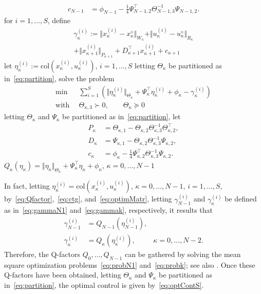 \documentclass[10pt]{IEEEtran}      %
\newcommand{\col}{\mathrm{col}}
\theoremstyle{theorem}
\theoremstyle{remark}
\begin{document}
\begin{algorithm}[H]
\begin{algorithmic}[1]
\begin{align*}
	 c_{N-1} & = \phi_{N-1} - \tfrac{1}{4}\Psi_{N-1,2}^\top\Theta_{N-1,3}^{-1}\Psi_{N-1,2}.
	 \end{align*}
	\STATE for $i=1,\dots,S$, define
		\begin{multline}\label{eq:gammak}
		\gamma_{\kappa}^{(i)}:=\Vert x_{\kappa}^{(i)}-x_{\kappa}^\diamond\Vert_{W_{\kappa}}+\Vert u_{\kappa}^{(i)}-u_{\kappa}^\diamond\Vert_{R_{\kappa}}\\
			+\Vert x_{\kappa+1}^{(i)}\Vert_{P_{\kappa+1}}+D_{\kappa+1}^\top x_{\kappa+1}^{(i)}+c_{\kappa+1}
		\end{multline}
	 \STATE let $\eta_{\kappa}^{(i)}:=\col(x_{\kappa}^{(i)},u_{\kappa}^{(i)})$, $i=1,\dots,S$
	 \STATE letting $\Theta_{\kappa}$ be partitioned as in~\eqref{eq:partition}, solve the problem
	 	\begin{align}
	 	\nonumber \min\,&\sum_{i=1}^{S} \left(\Vert \eta_{\kappa}^{(i)} \Vert_{\Theta_{\kappa}}
	 	+\Psi_{\kappa}^\top \eta_{\kappa}^{(i)} + \phi_{\kappa}-\gamma_{\kappa}^{(i)}\right)\\
	 	\text{with }\,&\Theta_{\kappa,3} \succ 0, \qquad \Theta_{\kappa} \succeq 0\label{eq:probk}
	 		\end{align}
	 	\STATE letting $\Theta_{\kappa}$ and $\Psi_{\kappa}$ be partitioned as in~\eqref{eq:partition}, let
	 		\begin{align*}
	 		P_{\kappa} & = \Theta_{\kappa,1} - \Theta_{\kappa,2}\Theta_{\kappa,3}^{-1}\Theta_{\kappa,2}^\top,\\
	 		D_{\kappa} & =\Psi_{\kappa,1}-\Theta_{\kappa,2}\Theta_{\kappa,3}^{-1}\Psi_{\kappa,2},\\
	 		c_{\kappa} & = \phi_\kappa - \tfrac{1}{4}\Psi_{\kappa,2}^\top\Theta_{\kappa,3}^{-1}\Psi_{\kappa,2}.
	 		\end{align*}
\ENDFOR
\RETURN $Q_\kappa(\eta_\kappa) = \Vert \eta_\kappa \Vert_{\Theta_\kappa} + \Psi_\kappa^\top \eta_\kappa +\phi_\kappa$, $\kappa=0,\dots,N-1$
\end{algorithmic}
\end{algorithm}

In fact, letting $\eta_\kappa^{(i)}=\col(x_{\kappa}^{(i)},u_\kappa^{(i)})$, $\kappa=0,\dots,N-1$, $i=1,\dots,S$, by~\eqref{eq:Qfactor},~\eqref{eq:ctg}, and~\eqref{eq:optimMatr},
letting $\gamma_{N-1}^{(i)}$ and $\gamma_{\kappa}^{(i)}$ be defined as in~\eqref{eq:gammaN1} and~\eqref{eq:gammak},
respectively, it results that 
\begin{align*}
\gamma_{N-1}^{(i)} &= Q_{N-1}(\eta_{N-1}^{(i)}),\\
\gamma_{\kappa}^{(i)} &= Q_{\kappa}(\eta_{\kappa}^{(i)}),&\kappa=0,\dots,N-2.
\end{align*}
Therefore, the Q-factors $Q_0,\dots,Q_{N-1}$ can be gathered by solving the mean square optimization problems~\eqref{eq:probN1}
and~\eqref{eq:probk}; see also \cite[Sec.~2.1.4]{bersekas2018reinf}. Once these Q-factors have been obtained, letting
$\Theta_\kappa$ and $\Psi_\kappa$ be partitioned as in~\eqref{eq:partition}, the optimal control is given by~\eqref{eq:optContS}.
\end{document}
